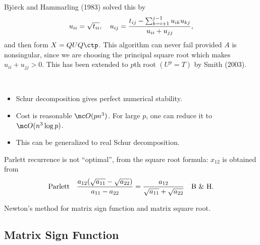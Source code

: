 \documentclass{article}
\begin{document}
Bj\"orck and Hammarling (1983) solved this by 
\begin{equation}\notag
    u_{ii} =\sqrt{t_{ii}}, \quad 
    u_{ij} = \frac{t_{ij} - \sum_{k=i+1}^{j-1}u_{ik}u_{kj}}{u_{ii}+u_{jj}},
\end{equation}
and then form $X = QUQ\ctp$. This algorithm can never fail provided $A$
is nonsingular, since we are choosing the principal square root which
makes $u_{ii} + u_{jj} > 0$. This has been extended to $p$th root $(U^p
= T)$ by Smith (2003).

\begin{remark}
    \ 
    \begin{itemize}
        \item Schur decomposition gives perfect numerical stability.
        \item Cost is reasonable $\mc O(pn^3)$. For large $p$, one can
        reduce it to $\mc O(n^3 \log p)$.
        \item This can be generalized to real Schur decomposition. 
    \end{itemize}
\end{remark}

\begin{remark}
    Parlett recurrence is not ``optimal'', from the square root formula:
    $x_{12}$ is obtained from 
    \begin{equation}\notag
        \text{Parlett}\quad \frac{a_{12}(\sqrt{a_{11}}-\sqrt{a_{22}})}{a_{11} - a_{22}} = \frac{a_{12}}{\sqrt{a_{11}} + \sqrt{a_{22}}} \quad \text{B \& H}.
    \end{equation}
\end{remark}

\begin{mybox}
    {} Newton's method for matrix sign function and matrix square root.
\end{mybox}

\subsection{Matrix Sign Function}
\end{document}
